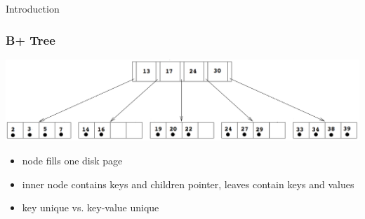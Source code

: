 \documentclass{beamer}
\begin{document}
\begin{section}{Introduction}
    \begin{frame}
      \frametitle{B+ Tree}
      \vspace{-3em}
      \includegraphics[scale=0.2]{B+Tree.png}
      \vspace{1em}
      \begin{itemize}
        \item node fills one disk page
        \item inner node contains keys and children pointer, leaves contain keys and values
        \item key unique vs. key-value unique
      \end{itemize}
    \end{frame}


\end{section}
\end{document}
